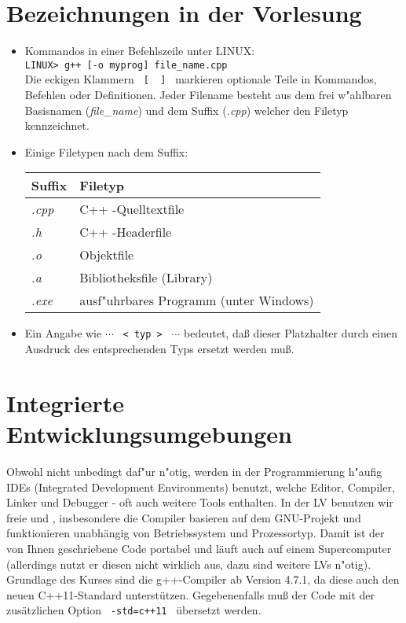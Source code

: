 \section{Bezeichnungen in der Vorlesung}
\label{p:1.4}
%
\begin{itemize}
 \item Kommandos in einer Befehlszeile unter LINUX:\\
 	\texttt{LINUX> g++ [-o myprog] file\_name.cpp} \\
	Die eckigen Klammern \verb| [  ] | markieren optionale
	Teile in Kommandos, Befehlen oder Definitionen.
	Jeder Filename besteht aus dem frei w"ahlbaren Basisnamen
	(\textit{file\_name}) und dem Suffix (\textit{.cpp}) welcher
	den Filetyp kennzeichnet.
 \item Einige Filetypen nach dem Suffix: 

  \nopagebreak
  \begin{tabular}{l@{\qquad}p{}}
  	Suffix 		& Filetyp \\ \hline
	\textit{.cpp}
			& C++ -Quelltextfile\\
	\textit{.h} %
			& C++ -Headerfile\\
	\textit{.o}	& Objektfile \index{Objektfile}\\
	\textit{.a}	& Bibliotheksfile (Library) \index{Bibliothek} \\
        \textit{.exe}	& ausf"uhrbares Programm (unter Windows)
  \end{tabular}
  \item Ein Angabe wie \qquad
  	$\cdots$ \verb| < typ > | $\cdots$
	\qquad bedeutet, da{\ss}  dieser Platzhalter durch
	einen Ausdruck des entsprechenden Typs ersetzt werden mu\ss.
\end{itemize}
%
%
%
\newpage
\section{Integrierte Entwicklungsumgebungen}
\label{p:1.5}
%
Obwohl nicht unbedingt daf"ur n"otig, werden in der Programmierung h"aufig IDEs
(Integrated Development Environments) benutzt, welche Editor, Compiler, Linker und
Debugger - oft auch weitere Tools enthalten.
In der LV benutzen wir freie  und
,
insbesondere die Compiler basieren auf dem GNU-Projekt und funktionieren
unabhängig von Betriebssystem und Prozessortyp. Damit ist der von Ihnen geschriebene Code
portabel und läuft auch auf einem Supercomputer
(allerdings nutzt er diesen nicht wirklich aus, dazu sind weitere LVs n"otig).
Grundlage des Kurses sind die g++-Compiler ab Version 4.7.1, da diese auch den neuen C++11-Standard unterstützen.
Gegebenenfalls muß der Code mit der zusätzlichen Option \verb| -std=c++11 | übersetzt werden.

